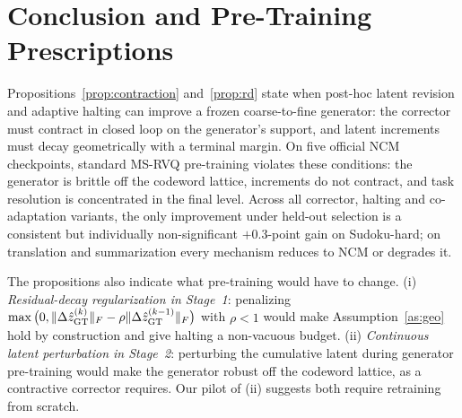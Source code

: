 \section{Conclusion and Pre-Training Prescriptions}
\label{sec:concl}
Propositions~\ref{prop:contraction} and~\ref{prop:rd} state when post-hoc latent revision and adaptive halting can improve a frozen coarse-to-fine generator: the corrector must contract in closed loop on the generator's support, and latent increments must decay geometrically with a terminal margin. On five official NCM checkpoints, standard MS-RVQ pre-training violates these conditions: the generator is brittle off the codeword lattice, increments do not contract, and task resolution is concentrated in the final level. Across all corrector, halting and co-adaptation variants, the only improvement under held-out selection is a consistent but individually non-significant $+0.3$-point gain on Sudoku-hard; on translation and summarization every mechanism reduces to NCM or degrades it.

The propositions also indicate what pre-training would have to change. (i) \emph{Residual-decay regularization in Stage~1}: penalizing $\max\big(0,\|\Delta\hat{z}^{(k)}_{\mathrm{GT}}\|_F-\rho\|\Delta\hat{z}^{(k-1)}_{\mathrm{GT}}\|_F\big)$ with $\rho<1$ would make Assumption~\ref{as:geo} hold by construction and give halting a non-vacuous budget. (ii) \emph{Continuous latent perturbation in Stage~2}: perturbing the cumulative latent during generator pre-training would make the generator robust off the codeword lattice, as a contractive corrector requires. Our pilot of (ii) suggests both require retraining from scratch.